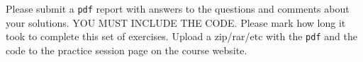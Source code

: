 \documentclass[a4paper,11pt]{article}
\begin{document}
\ \\
\ \\
\ \\
\ \\
\ \\
Please submit a \texttt{pdf} report with answers to the questions and comments about your solutions. YOU MUST INCLUDE THE CODE. Please mark how long it took to complete this set of exercises. Upload a zip/rar/etc with the \texttt{pdf} and the code to the practice session page on the course website.
\end{document}

